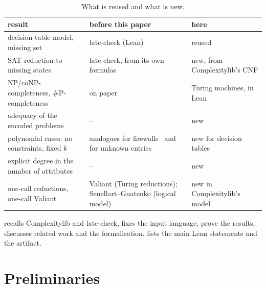 \documentclass[a4paper,UKenglish,cleveref,autoref,thm-restate]{lipics-v2021}
\begin{document}
\begin{table}[t]
\caption{What is reused and what is new.}
\label{tab:contrib}
\centering\small
\begin{tabular}{L{0.38\textwidth}L{0.26\textwidth}L{0.26\textwidth}}
\hline
result & before this paper & here \\
\hline
decision-table model, missing set & latc-check (Lean) & reused \\
SAT reduction to missing states & latc-check, from its own formulas & new, from Complexitylib's CNF \\
NP/coNP-completeness, \#P-completeness & on paper~\cite[Prop.~5]{PaperA} & Turing machines, in Lean \\
adequacy of the encoded problems & -- & new \\
polynomial cases: no constraints, fixed $k$ & analogues for firewalls~\cite{HamiltonRoughanNguyen2022} and for unknown entries~\cite{VuDemetrovics2026} & new for decision tables \\
explicit degree in the number of attributes & -- & new \\
one-call reductions, one-call Valiant & Valiant (Turing reductions); Senellart--Gnatenko (logical model) & new in Complexitylib's model \\
\hline
\end{tabular}
\end{table}

 recalls Complexitylib and latc-check,  fixes the input
language,  prove the results,
 discusses related work and  the formalisation.
 lists the main Lean statements and  the artifact.

\section{Preliminaries}
\label{sec:prelim}
\end{document}
